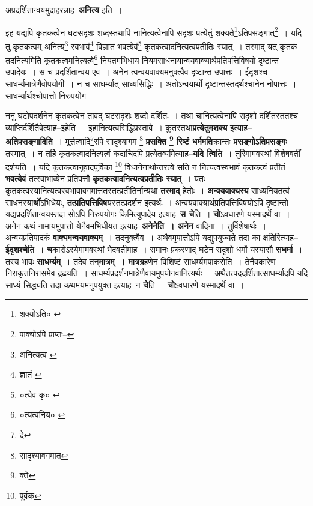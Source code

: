\documentclass[article,12pt,a4paper]{memoir}
\begin{document}
	  \pstart अप्रदर्शितान्वयमुदाहरन्नाह--\textbf{अनित्य} इति ।
	\pend
	  \bigskip
	  \begingroup
	

	  \pstart इह यद्यपि कृतकत्वेन घटसदृशः शब्दस्तथापि नानित्यत्वेनापि सदृशः प्रत्येतुं शक्यते\footnote{शक्योऽति० \cite{dp-msA} \cite{dp-edP} \cite{dp-edH} \cite{dp-edE} \cite{dp-edN}}ऽतिप्रसङ्गात्\footnote{पाक्योऽपि प्राप्तः--\cite{dp-msD-n}} । यदि तु कृतकत्वम् अनित्य\footnote{अनित्यत्व \cite{dp-msA} \cite{dp-msC} \cite{dp-edP} \cite{dp-edH} \cite{dp-edE} \cite{dp-edN}} स्वभावं\footnote{ज्ञातं \cite{dp-msC}} विज्ञातं भवत्येवं\footnote{०त्येव कृ० \cite{dp-msC}} कृतकत्वादनित्यत्वप्रतीतिः स्यात् । तस्माद् यत् कृतकं तदनित्यमिति कृतकत्वमनित्यत्वे\footnote{०त्यत्वनिय० \cite{dp-msA} \cite{dp-edP} \cite{dp-edH} \cite{dp-edE} \cite{dp-edN}} नियतमभिधाय नियमसाधनायान्वयवाक्यार्थप्रतिपत्तिविषयो दृष्टान्त उपादेयः । स च प्रदर्शितान्वय एव । अनेन त्वन्वयवाक्यमनुक्त्वैव दृष्टान्त उपात्तः । ईदृशश्च साधर्म्यमात्रेणैवोपयोगी । न च साधर्म्यात् साध्यसिद्धिः । अतोऽन्वयार्थो दृष्टान्तस्तदर्थश्चानेन नोपात्तः । साधर्म्यार्थश्चोपात्तो निरुपयोग
	\pend
      
	  \endgroup
	

	  \pstart ननु घटोपदर्शनेन कृतकत्वेन तावद् घटसदृशः शब्दो दर्शितः । तथा चानित्यत्वेनापि सदृशो दर्शितस्ततश्च व्याप्तिर्दर्शितैवेत्याह--इहेति । इहानित्यत्वसिद्धिप्रस्तावे । कुतस्तथा\textbf{प्रत्येतुमशक्य} इत्याह--\textbf{अतिप्रसङ्गादिति} । मूर्त्तत्वादि\footnote{दे}\-रपि सादृश्यागम \footnote{सादृश्यावगमात्} \textbf{प्रसक्ति \footnote{क्ते} रिष्टं धर्ममति}क्रान्तः \textbf{प्रसङ्गोऽतिप्रसङ्गः} तस्मात् । न तर्हि कृतकत्वादनित्यत्वं कदाचिदपि प्रत्येतव्यमित्याह--\textbf{यदि त्वि}ति । तुरिमामवस्थां विशेषवतीं दर्शयति । यदि कृतकत्वानुवादपूर्विका \footnote{पूर्वक} विधानेनार्थान्तरत्वे सति न नित्यत्वस्वभावं कृतकत्वं प्रतीतं \textbf{भवत्येवं} तत्स्वाभाव्येन प्रतिपत्तौ \textbf{कृतकत्वादनित्यत्वप्रतीतिः स्या}त् । यतः कृतकत्वस्यानित्यत्वस्वभावावगमात्ततस्तत्प्रतीतिर्नान्यथा \textbf{तस्माद्} हेतोः । \textbf{अन्वयवाक्यस्य} साध्यनियतत्वं साधनस्या\textbf{र्थो}ऽभिधेयः, \textbf{तत्प्रतिपत्तिविष}यस्तत्प्रदर्शन इत्यर्थः । अन्वयवाक्यार्थप्रतिपत्तिविषयोऽपि दृष्टान्तो यद्यप्रदर्शितान्वयस्तदा सोऽपि निरुपयोगः किमित्युपादेय इत्याह--\textbf{स चे}ति । \textbf{चो}ऽवधारणे यस्मादर्थे वा । अनेन कथं नामायमुपात्तो येनैवमभिधीयत इत्याह--\textbf{अनेनेति । अनेन} वादिना । तुर्विशेषार्थः । अन्वयप्रतिपादकं \textbf{वाक्यमन्वयवाक्यम्} । तदनुक्त्वैव । अथैवमुपात्तोऽपि यद्युपयुज्यते तदा का क्षतिरित्याह--\textbf{ईदृशश्चे}ति । \textbf{च}कारोऽस्येमामवस्थां भेदवतीमाह । समानः प्रकरणाद् घटेन सदृशो धर्मो यस्यासौ \textbf{सधर्मा} । तस्य भावः \textbf{साधर्म्यम्} । तदेव तन्\textbf{मात्रम् । मात्रग्र}हणेन विशिष्टं साधर्म्यमपाकरोति । तेनैवकारेण निराकृतनिरासमेव द्रढयति । साधर्म्यप्रदर्शनमात्रेणैवायमुपयोगवानित्यर्थः । अथैतत्पददर्शितात्साधर्म्यादपि यदि साध्यं सिद्ध्यति तदा कथमयमनुपयुक्त इत्याह--न \textbf{चे}ति । \textbf{चो}ऽवधारणे यस्मादर्थे वा ।
	\pend
      
\end{document}
